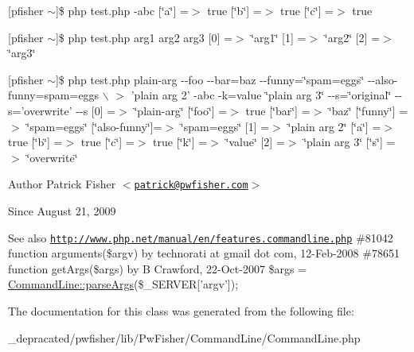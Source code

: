 \mbox{[}pfisher $\sim$\mbox{]}\$ php test.\-php -\/abc \mbox{[}\char`\"{}a\char`\"{}\mbox{]} =$>$ true \mbox{[}\char`\"{}b\char`\"{}\mbox{]} =$>$ true \mbox{[}\char`\"{}c\char`\"{}\mbox{]} =$>$ true

\mbox{[}pfisher $\sim$\mbox{]}\$ php test.\-php arg1 arg2 arg3 \mbox{[}0\mbox{]} =$>$ \char`\"{}arg1\char`\"{} \mbox{[}1\mbox{]} =$>$ \char`\"{}arg2\char`\"{} \mbox{[}2\mbox{]} =$>$ \char`\"{}arg3\char`\"{}

\mbox{[}pfisher $\sim$\mbox{]}\$ php test.\-php plain-\/arg -\/-\/foo -\/-\/bar=baz -\/-\/funny=\char`\"{}spam=eggs\char`\"{} -\/-\/also-\/funny=spam=eggs $\backslash$ $>$ 'plain arg 2' -\/abc -\/k=value \char`\"{}plain arg 3\char`\"{} -\/-\/s=\char`\"{}original\char`\"{} -\/-\/s='overwrite' -\/-\/s \mbox{[}0\mbox{]} =$>$ \char`\"{}plain-\/arg\char`\"{} \mbox{[}\char`\"{}foo\char`\"{}\mbox{]} =$>$ true \mbox{[}\char`\"{}bar\char`\"{}\mbox{]} =$>$ \char`\"{}baz\char`\"{} \mbox{[}\char`\"{}funny\char`\"{}\mbox{]} =$>$ \char`\"{}spam=eggs\char`\"{} \mbox{[}\char`\"{}also-\/funny\char`\"{}\mbox{]}=$>$ \char`\"{}spam=eggs\char`\"{} \mbox{[}1\mbox{]} =$>$ \char`\"{}plain arg 2\char`\"{} \mbox{[}\char`\"{}a\char`\"{}\mbox{]} =$>$ true \mbox{[}\char`\"{}b\char`\"{}\mbox{]} =$>$ true \mbox{[}\char`\"{}c\char`\"{}\mbox{]} =$>$ true \mbox{[}\char`\"{}k\char`\"{}\mbox{]} =$>$ \char`\"{}value\char`\"{} \mbox{[}2\mbox{]} =$>$ \char`\"{}plain arg 3\char`\"{} \mbox{[}\char`\"{}s\char`\"{}\mbox{]} =$>$ \char`\"{}overwrite\char`\"{}

\begin{DoxyAuthor}{\-Author}
\-Patrick \-Fisher $<$\href{mailto:patrick@pwfisher.com}{\tt patrick@pwfisher.\-com}$>$ 
\end{DoxyAuthor}
\begin{DoxySince}{\-Since}
\-August 21, 2009 
\end{DoxySince}
\begin{DoxySeeAlso}{\-See also}
\href{http://www.php.net/manual/en/features.commandline.php}{\tt http\-://www.\-php.\-net/manual/en/features.\-commandline.\-php} \#81042 function arguments(\$argv) by technorati at gmail dot com, 12-\/\-Feb-\/2008 \#78651 function get\-Args(\$args) by \-B \-Crawford, 22-\/\-Oct-\/2007  \$args = \hyperlink{class_pw_fisher_1_1_command_line_1_1_command_line_aa367e54f990c7fd9c495576f3e0b8eb3}{\-Command\-Line\-::parse\-Args}(\$\-\_\-\-S\-E\-R\-V\-E\-R\mbox{[}'argv'\mbox{]}); 
\end{DoxySeeAlso}


\-The documentation for this class was generated from the following file\-:\begin{DoxyCompactItemize}
\item 
\-\_\-depracated/pwfisher/lib/\-Pw\-Fisher/\-Command\-Line/\-Command\-Line.\-php\end{DoxyCompactItemize}
